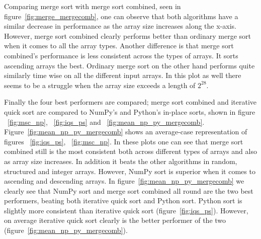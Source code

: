 \documentclass[sigconf, nonacm, natbib, screen, balance=False]{acmart}
\begin{document}
Comparing merge sort with merge sort combined, seen in figure~\ref{fig:merge_mergecomb}, one can observe that both algorithms have a similar decrease in performance as the array size increases along the x-axis. However, merge sort combined clearly performs better than ordinary merge sort when it comes to all the array types. Another difference is that merge sort combined's performance is less consistent across the types of arrays. It sorts ascending arrays the best. Ordinary merge sort on the other hand performs quite similarly time wise on all the different input arrays. In this plot as well there seems to be a struggle when the array size exceeds a length of $2^{28}$. 

Finally the four best performers are compared; merge sort combined and iterative quick sort are compared to NumPy's and Python's in-place sorts, shown in figure ~\ref{fig:msc_np}, ~\ref{fig:iqs_ps} and ~\ref{fig:mean_np_py_mergecomb}. Figure~\ref{fig:mean_np_py_mergecomb} shows an average-case representation of figures ~\ref{fig:iqs_ps}, ~\ref{fig:msc_np}. In these plots one can see that merge sort combined still is the most consistent both across different types of arrays and also as array size increases. In addition it beats the other algorithms in random, structured and integer arrays. However, NumPy sort is superior when it comes to ascending and descending arrays. In figure~\ref{fig:mean_np_py_mergecomb} we clearly see that NumPy sort and merge sort combined all round are the two best performers, beating both iterative quick sort and Python sort. Python sort is slightly more consistent than iterative quick sort (figure~\ref{fig:iqs_ps}). However, on average iterative quick sort clearly is the better performer of the two (figure~\ref{fig:mean_np_py_mergecomb}).


\end{document}
